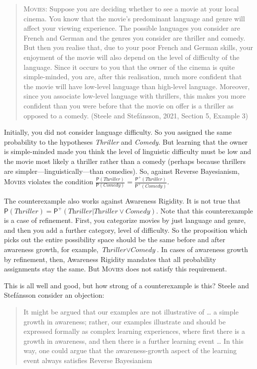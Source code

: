 \documentclass[
  11pt,
  dvipsnames,enabledeprecatedfontcommands]{scrartcl}
\newcommand{\pr}[1]{\ensuremath{\mathsf{P}(#1)}}
\newcommand{\ppr}[2]{\ensuremath{\mathsf{P}^{#1}(#2)}}
\begin{document}
\begin{quote}
\textsc{Movies}: Suppose you are deciding whether to see a movie at your
local cinema. You know that the movie's predominant language and genre
will affect your viewing experience. The possible languages you consider
are French and German and the genres you consider are thriller and
comedy. But then you realise that, due to your poor French and German
skills, your enjoyment of the movie will also depend on the level of
difficulty of the language. Since it occurs to you that the owner of the
cinema is quite simple-minded, you are, after this realisation, much
more confident that the movie will have low-level language than
high-level language. Moreover, since you associate low-level language
with thrillers, this makes you more confident than you were before that
the movie on offer is a thriller as opposed to a comedy. (Steele and
Stefánsson, 2021, Section 5, Example 3)
\end{quote}

\noindent Initially, you did not consider language difficulty. So you
assigned the same probability to the hypotheses \textit{Thriller} and
\textit{Comedy}. But learning that the owner is simple-minded made you
think the level of linguistic difficulty must be low and the movie most
likely a thriller rather than a comedy (perhaps because thrillers are
simpler---linguistically---than comedies). So, against Reverse
Bayesianism, \textsc{Movies} violates the condition
\(\frac{\pr{\textit{Thriller}}}{\pr{\textit{Comedy}}}=\frac{\ppr{+}{\textit{Thriller}}}{\ppr{+}{\textit{Comedy}}}\).

The counterexample also works against Awareness Rigidity. It is not true
that
\(\pr{\textit{Thriller}}=\ppr{+}{\textit{Thriller} \vert \textit{Thriller}\vee \textit{Comedy}}\).
Note that this counterexample is a case of refinement. First, you
categorize movies by just language and genre, and then you add a further
category, level of difficulty. So the proposition which picks out the
entire possibility space should be the same before and after awareness
growth, for example, \(\textit{Thriller}\vee \textit{Comedy}\). In cases
of awareness growth by refinement, then, Awareness Rigidity mandates
that all probability assignments stay the same. But \textsc{Movies} does
not satisfy this requirement.

This is all well and good, but how strong of a counterexample is this?
Steele and Stefánsson consider an objection:

\begin{quote}
It might be argued that our examples are not illustrative of \ldots{} a
simple growth in awareness; rather, our examples illustrate and should
be expressed formally as complex learning experiences, where first there
is a growth in awareness, and then there is a further learning event
\ldots{} In this way, one could argue that the awareness-growth aspect
of the learning event always satisfies Reverse Bayesianism
\end{quote}
\end{document}
